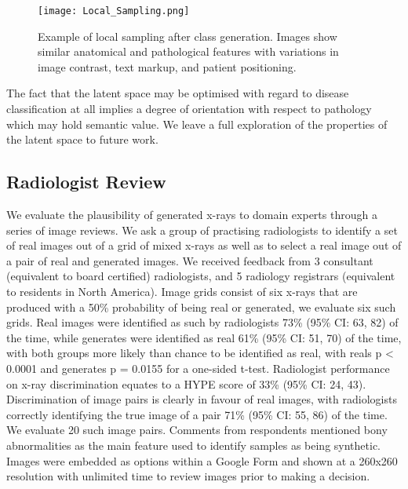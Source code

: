 \documentclass{article}
\begin{document}
\begin{figure}
    \centering
    \texttt{[image: Local\_Sampling.png]}
    \caption{Example of local sampling after class generation. Images show similar anatomical and pathological features with variations in image contrast, text markup, and patient positioning.}
    \label{fig:local}
\end{figure}

The fact that the latent space may be optimised with regard to disease classification at all implies a degree of orientation with respect to pathology which may hold semantic value. We leave a full exploration of the properties of the latent space to future work.

\subsection{Radiologist Review}
\label{sec:review}
We evaluate the plausibility of generated x-rays to domain experts through a series of image reviews. We ask a group of practising radiologists to identify a set of real images out of a grid of mixed x-rays as well as to select a real image out of a pair of real and generated images. We received feedback from 3 consultant (equivalent to board certified) radiologists, and 5 radiology registrars (equivalent to residents in North America). Image grids consist of six x-rays that are produced with a \num{50}\% probability of being real or generated, we evaluate six such grids. Real images were identified as such by radiologists \num{73}\% (95\% CI: \num{63}, \num{82}) of the time, while generates were identified as real \num{61}\% (95\% CI: \num{51}, \num{70}) of the time, with both groups more likely than chance to be identified as real, with reals p < \num{0.0001} and generates p = \num{0.0155} for a one-sided t-test. 
Radiologist performance on x-ray discrimination equates to a HYPE score of \num{33}\% (95\% CI: \num{24}, \num{43}).  
Discrimination of image pairs is clearly in favour of real images, with radiologists correctly identifying the true image of a pair \num{71}\% (95\% CI: \num{55}, \num{86}) of the time. We evaluate \num{20} such image pairs. Comments from respondents mentioned bony abnormalities as the main feature used to identify samples as being synthetic. Images were embedded as options within a Google Form and shown at a 260x260 resolution with unlimited time to review images prior to making a decision. 
\end{document}
